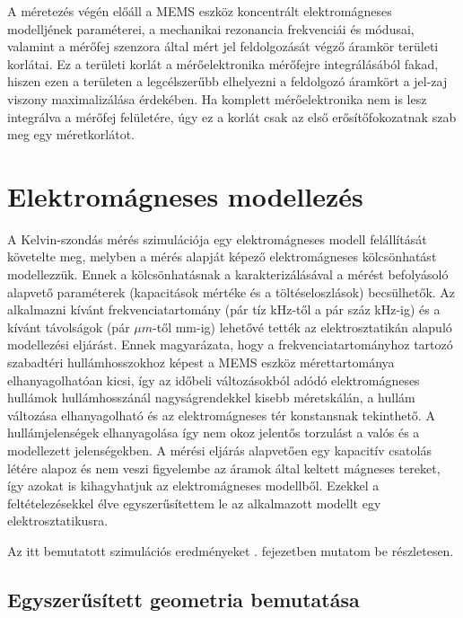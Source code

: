 
A méretezés végén előáll a MEMS eszköz koncentrált elektromágneses modelljének paraméterei, a mechanikai rezonancia frekvenciái és módusai, valamint a mérőfej szenzora által mért jel feldolgozását végző áramkör területi korlátai. Ez a területi korlát a mérőelektronika mérőfejre integrálásából fakad, hiszen ezen a területen a legcélszerűbb elhelyezni a feldolgozó áramkört a jel-zaj viszony maximalizálása érdekében. Ha komplett mérőelektronika nem is lesz integrálva a mérőfej felületére, úgy ez a korlát csak az első erősítőfokozatnak szab meg egy méretkorlátot.

\section{Elektromágneses modellezés}

A Kelvin-szondás mérés szimulációja egy elektromágneses modell felállítását követelte meg, melyben a mérés alapját képező elektromágneses kölcsönhatást modellezzük. Ennek a kölcsönhatásnak a karakterizálásával a mérést befolyásoló alapvető paraméterek (kapacitások mértéke és a töltéseloszlások) becsülhetők. Az alkalmazni kívánt frekvenciatartomány (pár tíz kHz-től a pár száz kHz-ig) és a kívánt távolságok (pár $\mu m$-től mm-ig) lehetővé tették az elektrosztatikán alapuló modellezési eljárást. Ennek magyarázata, hogy a frekvenciatartományhoz  tartozó szabadtéri hullámhosszokhoz képest a MEMS eszköz mérettartománya elhanyagolhatóan kicsi, így az időbeli változásokból adódó elektromágneses hullámok hullámhosszánál nagyságrendekkel kisebb méretskálán, a hullám változása elhanyagolható és az elektromágneses tér konstansnak tekinthető. A hullámjelenségek elhanyagolása így nem okoz jelentős torzulást a valós és a modellezett jelenségekben. A mérési eljárás alapvetően egy kapacitív csatolás létére alapoz és nem veszi figyelembe az áramok által keltett mágneses tereket, így azokat is kihagyhatjuk az elektromágneses modellből. Ezekkel a feltételezésekkel élve egyszerűsítettem le az alkalmazott modellt egy elektrosztatikusra.

Az itt bemutatott szimulációs eredményeket . fejezetben mutatom be részletesen.

\subsection{Egyszerűsített geometria bemutatása}

